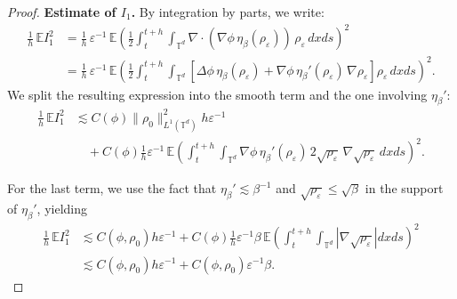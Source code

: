 \documentclass[UTF-8,reqno]{amsart}
\numberwithin{equation}{section}
\def\leq{\leqslant}
\def\leq{\leqslant}
\begin{document}
\begin{proof}
\medskip
\noindent\textbf{Estimate of $ I_1 $.} By integration by parts, we write:
\begin{align*}
\frac{1}{h} \, \mathbb{E} I_1^2 
&= \frac{1}{h} \, \varepsilon^{-1} \, \mathbb{E} \left( \frac{1}{2}\int_t^{t+h} \int_{\mathbb{T}^d} \nabla \cdot (\nabla \phi \, \eta_{\beta}(\rho_{\varepsilon})) \, \rho_{\varepsilon} \, dx ds \right)^2 \\
&= \frac{1}{h} \, \varepsilon^{-1} \, \mathbb{E} \left( \frac{1}{2}\int_t^{t+h} \int_{\mathbb{T}^d} \left[ \Delta \phi \, \eta_{\beta}(\rho_{\varepsilon}) + \nabla \phi \, \eta_{\beta}'(\rho_{\varepsilon}) \, \nabla \rho_{\varepsilon} \right] \rho_{\varepsilon} \, dx ds \right)^2.
\end{align*}
We split the resulting expression into the smooth term and the one involving $\eta_\beta'$:
\begin{align*}
\frac{1}{h} \, \mathbb{E} I_1^2 
&\lesssim C(\phi)\|\rho_0\|_{L^1(\mathbb{T}^d)}^2 h \varepsilon^{-1} \\
&\quad+ C(\phi) \frac{1}{h} \varepsilon^{-1} \, \mathbb{E} \left( \int_t^{t+h} \int_{\mathbb{T}^d} \nabla \phi \, \eta_{\beta}'(\rho_{\varepsilon}) \, 2 \sqrt{\rho_{\varepsilon}} \, \nabla \sqrt{\rho_{\varepsilon}} \, dx ds \right)^2.
\end{align*}

For the last term, we use the fact that $ \eta_{\beta}' \lesssim \beta^{-1} $ and $ \sqrt{\rho_{\varepsilon}} \leq \sqrt{\beta} $ in the support of $ \eta_{\beta}' $, yielding
\begin{align*}
\frac{1}{h} \, \mathbb{E} I_1^2 
&\lesssim C(\phi, \rho_0) h \varepsilon^{-1} 
+ C(\phi) \frac{1}{h} \varepsilon^{-1} \beta \, \mathbb{E} \left( \int_t^{t+h} \int_{\mathbb{T}^d} \left| \nabla \sqrt{\rho_{\varepsilon}} \right| dx ds \right)^2 \\
&\lesssim C(\phi, \rho_0) h \varepsilon^{-1} + C(\phi, \rho_0) \varepsilon^{-1} \beta.
\end{align*}


\end{proof}
\end{document}
